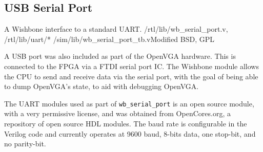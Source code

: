 \begin{center}
\begin{minipage}{0.8\linewidth}
\footnotesize

\normalsize
\end{minipage}
\end{center}



\subsection{USB Serial Port}
\label{USB_Sport}

{A Wishbone interface to a standard UART.} {/rtl/lib/wb\_serial\_port.v,
/rtl/lib/uart/*} {/sim/lib/wb\_serial\_port\_tb.v}{Modified BSD, GPL}

A USB port was also included as part of the OpenVGA hardware. This is connected
to the FPGA via a FTDI serial port IC. The Wishbone module allows the CPU to send
and receive data via the serial port, with the goal of being able to dump
OpenVGA's state, to aid with debugging OpenVGA.

The UART modules used as part of \texttt{wb\_serial\_port} is an open source
module, with a very permissive license, and was obtained from OpenCores.org, a
repository of open source HDL modules. The baud rate is configurable in the
Verilog code and currently operates at 9600 baud, 8-bits data, one stop-bit, and
no parity-bit.
